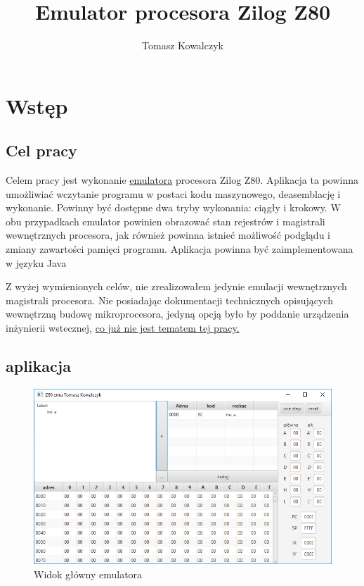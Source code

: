 \documentclass{article}
\author{Tomasz Kowalczyk}
\title{Emulator procesora Zilog Z80}
\begin{document}
	\maketitle
	\tableofcontents
	
	\section{Wstęp}
	\subsection{Cel pracy}
	Celem pracy jest wykonanie \underline{emulatora} procesora Zilog Z80. Aplikacja ta powinna umożliwiać wczytanie programu w postaci kodu maszynowego, deasemblację i wykonanie. Powinny być dostępne dwa tryby wykonania: ciągły i krokowy. W obu przypadkach emulator powinien obrazować stan rejestrów i magistrali wewnętrznych procesora, jak również powinna istnieć możliwość podglądu i zmiany zawartości pamięci programu. Aplikacja powinna być zaimplementowana w języku Java
	
	Z wyżej wymienionych celów, nie zrealizowałem jedynie emulacji wewnętrznych magistrali procesora. Nie posiadając dokumentacji technicznych opisujących wewnętrzną budowę mikroprocesora, jedyną opcją było by poddanie urządzenia inżynierii wstecznej, \underline{co już nie jest tematem tej pracy.}
	
	\subsection{aplikacja}
		
	\begin{figure}[h]
		\caption{Widok główny emulatora}
		\centering
		\includegraphics[width=1.0\textwidth]{app1}
	\end{figure}
	
\end{document}
